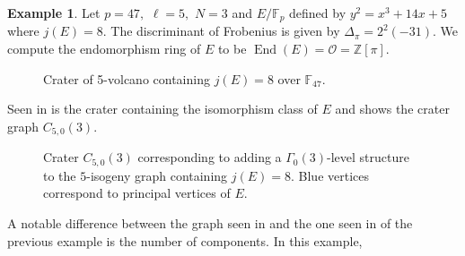 \documentclass[11pt,a4paper]{amsart}
\theoremstyle{plain}
\theoremstyle{definition}
\newtheorem{eg}[thm]{Example}
\theoremstyle{remark}
\DeclareMathOperator{\Endo}{End}
\begin{document}
\begin{eg}
  Let $p = 47,$ $\ell = 5,$ $N = 3$ and $E/\mathbb{F}_p$ defined by $y^2 = x^3 + 14x + 5$ where $j(E) = 8.$ The discriminant of Frobenius is given by $\Delta_{\pi} = 2^2(-31).$ We compute the endomorphism ring of $E$ to be $\Endo(E) = \mathcal{O} = \mathbb{Z}[\pi].$
  \begin{figure}[!hbtp]
  \centering
    \caption{Crater of 5-volcano containing $j(E) = 8$ over
    $\mathbb{F}_{47}.$}\label{fig:eg-ell-crater-j8}
  \end{figure}
  Seen in  is the crater containing the isomorphism class of $E$ and  shows the crater graph $C_{5,0}(3).$
  \begin{figure}[!hbtp]
    \centering
    \caption{Crater $C_{5,0}(3)$ corresponding to adding a $\Gamma_0(3)$-level structure to the $5$-isogeny graph containing $j(E) = 8.$ Blue vertices correspond to principal vertices of $E.$}\label{fig:eg-Gamma0-crater-j8}
  \end{figure}  A notable difference between the graph seen in  and the one seen in  of the previous example is the number of components. In this example,

\end{eg}
\end{document}
